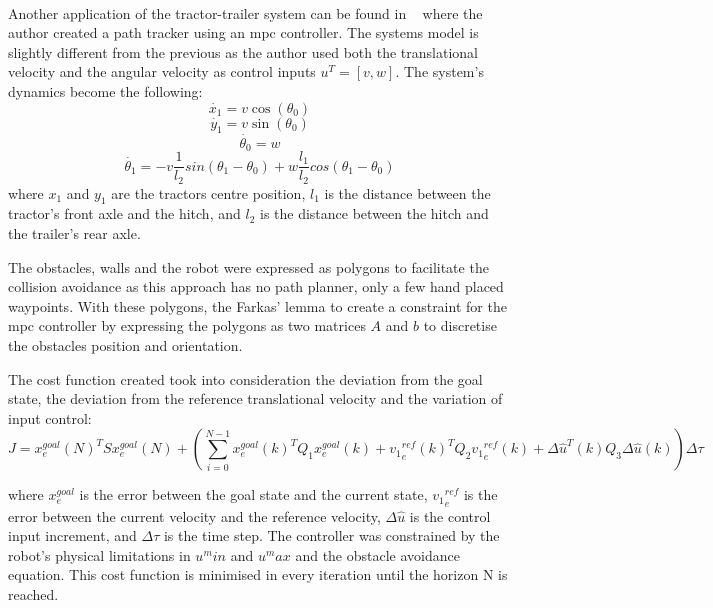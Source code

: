 \paragraph{}Another application of the tractor-trailer system can be found in ~\cite{mpconly}
where the author created a path tracker using an mpc controller. The systems model is slightly different 
from the previous as the author used both the translational velocity and the angular velocity as control 
inputs $u^T=[v, w]$. The system's dynamics become the following:
\begin{equation}
    \dot{x_1} = v \cos(\theta_0)
\end{equation}
\begin{equation}
    \dot{y_1} = v \sin(\theta_0)
\end{equation}
\begin{equation}
    \dot{\theta_0} = w
\end{equation}
\begin{equation}
    \dot{\theta_1} = -v\frac{1}{l_2}sin(\theta_1-\theta_0)  + w\frac{l_1}{l_2}cos(\theta_1-\theta_0)
\end{equation}
where $x_1$ and $y_1$ are the tractors centre position, $l_1$ is the distance between the tractor's front axle and the hitch, 
and $l_2$ is the distance between the hitch and the trailer's rear axle.

The obstacles, walls and the robot were expressed as polygons to facilitate the collision avoidance as 
this approach has no path planner, only a few hand placed waypoints. With these polygons, the 
Farkas' lemma to create a constraint for the mpc controller by expressing the polygons as two matrices
$A$ and $b$ to discretise the obstacles position and orientation.

The cost function created took into consideration the deviation from the goal state, the deviation 
from the reference translational velocity and the variation of input control:
\begin{equation}
    J = x_e^{goal}(N)^TSx_e^{goal}(N) + (\sum_{i=0}^{N-1}  x_e^{goal}(k)^T Q_1 x_e^{goal}(k) + {v_1}_e^{ref}(k)^T Q_2 {v_1}_e^{ref}(k) + \Delta \hat{u}^T(k)Q_3\Delta\hat{u}(k)) \Delta \tau
\end{equation}

where $x_e^{goal}$ is the error between the goal state and the current state, ${v_1}_e^{ref}$ is the error between the current velocity and the 
reference velocity, $\Delta \hat{u}$ is the control input increment, and $\Delta \tau$ is the time step. 
The controller was constrained by the robot's physical limitations in $u^min$ and $u^max$ and the obstacle avoidance equation. 
This cost function is minimised in every iteration until the horizon N is reached.

